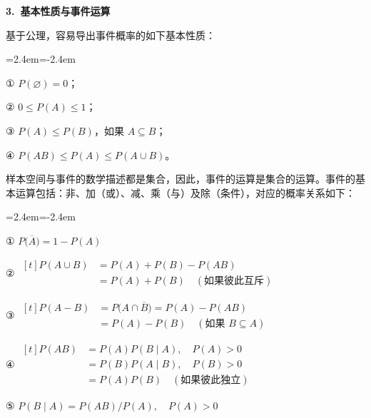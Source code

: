 \documentclass[11pt,openany,UTF8]{ctexbook}
\newcommand{\bhead}[1]{\par\medskip\noindent\textbf{#1}\par\smallskip}
\newenvironment{citemize}
  {\begin{list}{}{\leftmargin=2.4em\itemindent=-2.4em\itemsep=1pt\topsep=3pt\parsep=0pt}}
  {\end{list}}
\begin{document}
\bhead{3.\ 基本性质与事件运算}

基于公理\nobreak，容易导出事件概率的如下基本性质\nobreak：

\begin{citemize}
  \item ① $P(\varnothing)=0$\nobreak；
  \item ② $0\leqslant P(A)\leqslant 1$\nobreak；


  \item ③ $P(A)\leqslant P(B)$\nobreak，如果 $A\subseteq B$\nobreak；
  \item ④ $P(AB)\leqslant P(A)\leqslant P(A\cup B)$\nobreak。
\end{citemize}

样本空间与事件的数学描述都是集合\nobreak，因此\nobreak，事件的运算是集合的运算\nobreak。事件的基本运算包括\nobreak：非\nobreak、加（或\nobreak）\nobreak、减\nobreak、乘（与\nobreak）及除（条件\nobreak）\nobreak，对应的概率关系如下\nobreak：

\begin{citemize}
  \item ① $P\bigl(\overline{A}\bigr)=1-P(A)$
  \item ② $\begin{aligned}[t]
        P(A\cup B)&=P(A)+P(B)-P(AB)\\
        &=P(A)+P(B)\quad(\text{如果彼此互斥})
        \end{aligned}$
  \item ③ $\begin{aligned}[t]
        P(A-B)&=P\bigl(A\cap\overline{B}\bigr)=P(A)-P(AB)\\
        &=P(A)-P(B)\quad(\text{如果 $B\subseteq A$})
        \end{aligned}$
  \item ④ $\begin{aligned}[t]
        P(AB)&=P(A)P(B\mid A),\quad P(A)>0\\
        &=P(B)P(A\mid B),\quad P(B)>0\\
        &=P(A)P(B)\quad(\text{如果彼此独立})
        \end{aligned}$
  \item ⑤ $P(B\mid A)=P(AB)/P(A),\quad P(A)>0$
\end{citemize}
\end{document}
